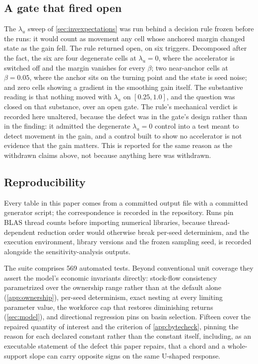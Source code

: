 \subsection{A gate that fired open}
\label{app:gate}

The $\lambda_u$ sweep of \cref{sec:invexpectations} was run behind a decision
rule frozen before the runs: it would count as movement any cell whose anchored
margin changed state as the gain fell. The rule returned open, on six triggers.
Decomposed after the fact, the six are four degenerate cells at $\lambda_u = 0$,
where the accelerator is switched off and the margin vanishes for every $\beta$;
two near-anchor cells at $\beta = 0.05$, where the anchor sits on the turning
point and the state is seed noise; and zero cells showing a gradient in the
smoothing gain itself. The substantive reading is that nothing moved with
$\lambda_u$ on $[0.25, 1.0]$, and the question was closed on that substance, over
an open gate. The rule's mechanical verdict is recorded here unaltered, because
the defect was in the gate's design rather than in the finding: it admitted the
degenerate $\lambda_u = 0$ control into a test meant to detect movement in the
gain, and a control built to show no accelerator is not evidence that the gain
matters. This is reported for the same reason as the withdrawn claims above, not
because anything here was withdrawn.

\subsection{Reproducibility}
\label{app:repro}

Every table in this paper comes from a committed output file with a committed
generator script; the correspondence is recorded in the repository. Runs pin
BLAS thread counts before importing numerical libraries, because
thread-dependent reduction order would otherwise break per-seed determinism,
and the execution environment, library versions and the frozen sampling seed, is recorded alongside the sensitivity-analysis outputs.

The suite comprises 569 automated tests. Beyond conventional unit coverage they
assert the model's economic invariants directly: stock-flow consistency
parametrized over the ownership range rather than at the default alone
(\cref{app:ownership}), per-seed determinism, exact nesting at every limiting
parameter value, the workforce cap that restores diminishing returns
(\cref{sec:model}), and directional regression pins on basin selection. Fifteen
cover the repaired quantity of interest and the criterion of
\cref{app:bytecheck}, pinning the reason for each declared constant
rather than the constant itself, including, as an executable statement of the
defect this paper repairs, that a chord and a whole-support slope can carry
opposite signs on the same U-shaped response.

